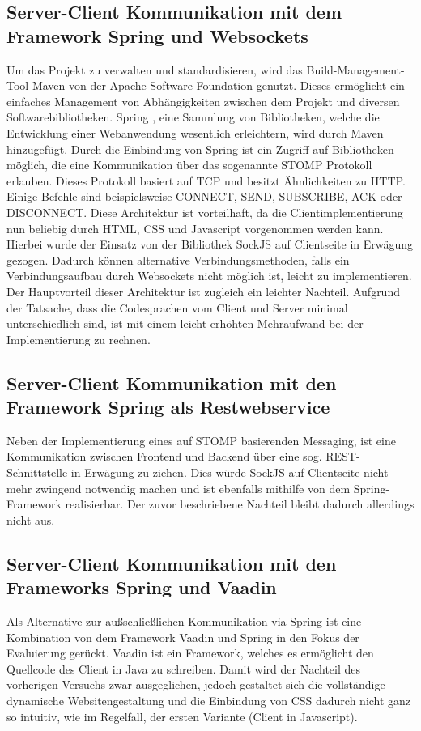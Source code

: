 \subsection{Server-Client Kommunikation mit dem Framework Spring und Websockets}
Um das Projekt zu verwalten und standardisieren, wird das Build-Management-Tool Maven\autocite[vgl.][]{Maven2} von der Apache Software Foundation genutzt. Dieses ermöglicht ein einfaches Management von Abhängigkeiten zwischen dem Projekt und diversen Softwarebibliotheken. Spring \autocite[vgl.][]{Spring}, eine Sammlung von Bibliotheken, welche die Entwicklung einer Webanwendung wesentlich erleichtern, wird durch Maven hinzugefügt. Durch die Einbindung von Spring ist ein Zugriff auf Bibliotheken möglich, die eine Kommunikation über das sogenannte STOMP Protokoll erlauben.\autocite[vgl.][]{SpringWithSTOMPExample} Dieses Protokoll basiert auf TCP und besitzt Ähnlichkeiten zu HTTP. Einige Befehle sind beispielsweise CONNECT, SEND, SUBSCRIBE, ACK oder DISCONNECT.
Diese Architektur ist vorteilhaft, da die Clientimplementierung nun beliebig durch HTML, CSS und Javascript vorgenommen werden kann. Hierbei wurde der Einsatz von der Bibliothek SockJS auf Clientseite in Erwägung gezogen. Dadurch können alternative Verbindungsmethoden, falls ein Verbindungsaufbau durch Websockets nicht möglich ist, leicht zu implementieren.
Der Hauptvorteil dieser Architektur ist zugleich ein leichter Nachteil. Aufgrund der Tatsache, dass die Codesprachen vom Client und Server minimal unterschiedlich sind, ist mit einem leicht erhöhten Mehraufwand bei der Implementierung zu rechnen.

\subsection{Server-Client Kommunikation mit den Framework Spring als Restwebservice}
Neben der Implementierung eines auf STOMP basierenden Messaging, ist eine Kommunikation zwischen Frontend und Backend über eine sog. REST-Schnittstelle in Erwägung zu ziehen. Dies würde SockJS auf Clientseite nicht mehr zwingend notwendig machen und ist ebenfalls mithilfe von dem Spring-Framework realisierbar. Der zuvor beschriebene Nachteil bleibt dadurch allerdings nicht aus. 

\subsection{Server-Client Kommunikation mit den Frameworks Spring und Vaadin}
Als Alternative zur außschließlichen Kommunikation via Spring ist eine Kombination von dem Framework Vaadin und Spring in den Fokus der Evaluierung gerückt. Vaadin ist ein Framework, welches es ermöglicht den Quellcode des Client in Java zu schreiben. Damit wird der Nachteil des vorherigen Versuchs zwar ausgeglichen, jedoch gestaltet sich die vollständige dynamische Websitengestaltung und die Einbindung von CSS dadurch nicht ganz so intuitiv, wie im Regelfall, der ersten Variante (Client in Javascript).


